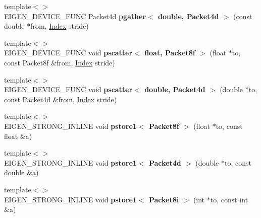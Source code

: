 \begin{DoxyCompactItemize}
\item 
\mbox{\label{namespace_eigen_1_1internal_aaa788ca4b2e2b622821d81e9b0f707de}} 
{\footnotesize template$<$$>$ }\\E\+I\+G\+E\+N\+\_\+\+D\+E\+V\+I\+C\+E\+\_\+\+F\+U\+NC Packet4d {\bfseries pgather$<$ double, Packet4d $>$} (const double $\ast$from, \hyperlink{namespace_eigen_a62e77e0933482dafde8fe197d9a2cfde}{Index} stride)
\item 
\mbox{\label{namespace_eigen_1_1internal_af99e078926c539a7f1125ceeef901738}} 
{\footnotesize template$<$$>$ }\\E\+I\+G\+E\+N\+\_\+\+D\+E\+V\+I\+C\+E\+\_\+\+F\+U\+NC void {\bfseries pscatter$<$ float, Packet8f $>$} (float $\ast$to, const Packet8f \&from, \hyperlink{namespace_eigen_a62e77e0933482dafde8fe197d9a2cfde}{Index} stride)
\item 
\mbox{\label{namespace_eigen_1_1internal_ab3badf8cf37bb5aef8f1e31326ddc511}} 
{\footnotesize template$<$$>$ }\\E\+I\+G\+E\+N\+\_\+\+D\+E\+V\+I\+C\+E\+\_\+\+F\+U\+NC void {\bfseries pscatter$<$ double, Packet4d $>$} (double $\ast$to, const Packet4d \&from, \hyperlink{namespace_eigen_a62e77e0933482dafde8fe197d9a2cfde}{Index} stride)
\item 
\mbox{\label{namespace_eigen_1_1internal_a2ba31b602d511fce22f1049164c053d3}} 
{\footnotesize template$<$$>$ }\\E\+I\+G\+E\+N\+\_\+\+S\+T\+R\+O\+N\+G\+\_\+\+I\+N\+L\+I\+NE void {\bfseries pstore1$<$ Packet8f $>$} (float $\ast$to, const float \&a)
\item 
\mbox{\label{namespace_eigen_1_1internal_a63d9077ff787720975cb4674ce682655}} 
{\footnotesize template$<$$>$ }\\E\+I\+G\+E\+N\+\_\+\+S\+T\+R\+O\+N\+G\+\_\+\+I\+N\+L\+I\+NE void {\bfseries pstore1$<$ Packet4d $>$} (double $\ast$to, const double \&a)
\item 
\mbox{\label{namespace_eigen_1_1internal_a1aa9d0ad3dcabe44be98dba71b22f7cc}} 
{\footnotesize template$<$$>$ }\\E\+I\+G\+E\+N\+\_\+\+S\+T\+R\+O\+N\+G\+\_\+\+I\+N\+L\+I\+NE void {\bfseries pstore1$<$ Packet8i $>$} (int $\ast$to, const int \&a)

\end{DoxyCompactItemize}
